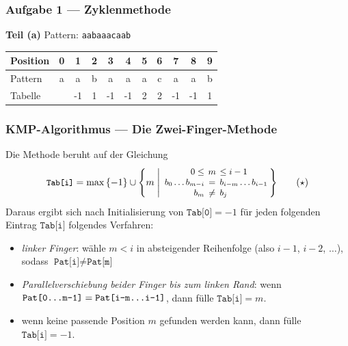 \documentclass{beamer}
\begin{document}
\begin{frame}[t] \frametitle{Aufgabe 1 --- Zyklenmethode \hfill {}}
	\textbf{Teil (a)} \hspace{3em}
	Pattern: {\large \texttt{aabaaacaab}} \\[1em]
	
	\begin{center}
		\renewcommand*{\arraystretch}{1.3} \setlength{\tabcolsep}{8pt}
		\begin{tabular}{l|cccccccccc}
			Position &  0 &  1 &  2 &  3 &  4 &  5 &  6 &  7 &  8 &  9 \\ \hline
			Pattern  &  a &  a &  b &  a &  a &  a &  c &  a &  a &  b \\ \hline
			Tabelle  & \only<2->{-1 & -1 &  1 & -1 & -1 &  2 &  2 & -1 & -1 &  1} \\
		\end{tabular}
	\end{center}
\end{frame}
	


\begin{frame} \frametitle{KMP-Algorithmus --- Die Zwei-Finger-Methode}
	Die Methode beruht auf der Gleichung
	\begin{equation*}
		\begin{aligned}
		\small
		\texttt{Tab[i]}
		= \max \menge{-1} \cup \menge{m \; \middle| \;
			\setlength{\arraycolsep}{2pt}
			 \begin{array}{rcl}
				0 \le &m& \le i-1 \\
				b_0 \dots b_{m-i} &=& b_{i-m} \dots b_{i-1} \\
				b_m &\neq& b_j \\
			\end{array} }
		\end{aligned} \tag{$\star$} \label{eq: kmp}
	\end{equation*}
	Daraus ergibt sich nach Initialisierung von $\texttt{Tab[0]} = -1$ für jeden folgenden Eintrag $\texttt{Tab[i]}$ folgendes Verfahren:
	\begin{itemize}
		\item \textit{linker Finger}: wähle $m < i$ in absteigender Reihenfolge (also $i-1$, $i-2$, $\dots$), sodass $\texttt{Pat[i]} \neq \texttt{Pat[m]}$
		\item \textit{Parallelverschiebung beider Finger bis zum linken Rand}: wenn $\texttt{Pat[0\dots m-1]} = \texttt{Pat[i-m\dots i-1]}$, dann fülle $\texttt{Tab[i]} = m$.
		\item wenn keine passende Position $m$ gefunden werden kann, dann fülle $\texttt{Tab[i]} = -1$.
	\end{itemize}
\end{frame}
\end{document}
